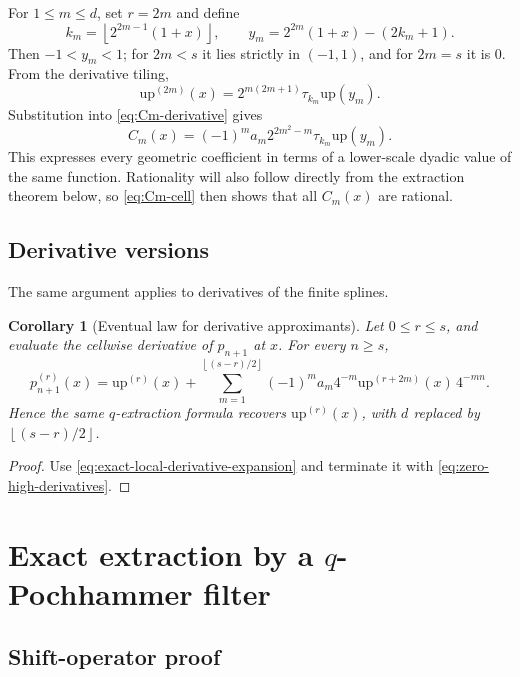 \documentclass[11pt,oneside]{article}
\numberwithin{equation}{section}
\newtheorem{corollary}[theorem]{Corollary}
\theoremstyle{definition}
\theoremstyle{remark}
\newcommand{\upf}{\mathrm{up}}
\newcommand{\floor}[1]{\left\lfloor #1\right\rfloor}
\newcommand{\TM}{\tau}
\begin{document}
For $1\le m\le d$, set $r=2m$ and define
\begin{equation}
 k_m=\floor{2^{2m-1}(1+x)},
 \qquad
 y_m=2^{2m}(1+x)-(2k_m+1).
 \label{eq:km-ym}
\end{equation}
Then $-1<y_m<1$; for $2m<s$ it lies
strictly in $(-1,1)$, and for $2m=s$ it is $0$.  From the derivative tiling,
\begin{equation}
 \upf^{(2m)}(x)=2^{m(2m+1)}\TM_{k_m}\upf(y_m).
 \label{eq:even-derivative-cell}
\end{equation}
Substitution into \eqref{eq:Cm-derivative} gives
\begin{equation}
 \boxed{\displaystyle
 C_m(x)=(-1)^ma_m2^{2m^2-m}\TM_{k_m}\upf(y_m).}
 \label{eq:Cm-cell}
\end{equation}
This expresses every geometric coefficient in terms of a lower-scale dyadic
value of the same function.  Rationality will also follow directly from the
extraction theorem below, so \eqref{eq:Cm-cell} then shows that all $C_m(x)$ are
rational.

\subsection{Derivative versions}

The same argument applies to derivatives of the finite splines.

\begin{corollary}[Eventual law for derivative approximants]
Let $0\le r\le s$, and evaluate the cellwise derivative of $p_{n+1}$ at $x$.
For every $n\ge s$,
\begin{equation}
 p_{n+1}^{(r)}(x)=\upf^{(r)}(x)
 +\sum_{m=1}^{\floor{(s-r)/2}}
 (-1)^ma_m4^{-m}\upf^{(r+2m)}(x)\,4^{-mn}.
 \label{eq:derivative-eventual-law}
\end{equation}
Hence the same $q$-extraction formula recovers $\upf^{(r)}(x)$, with
$d$ replaced by $\floor{(s-r)/2}$.
\end{corollary}

\begin{proof}
Use \eqref{eq:exact-local-derivative-expansion} and terminate it with
\eqref{eq:zero-high-derivatives}.
\end{proof}

\section{Exact extraction by a \texorpdfstring{$q$}{q}-Pochhammer filter}

\subsection{Shift-operator proof}
\end{document}
